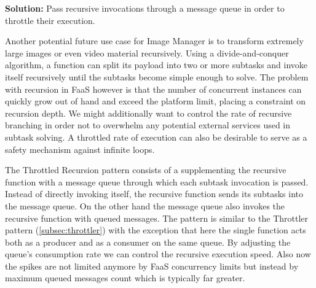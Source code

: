 
\textbf{Solution:} Pass recursive invocations through a message queue in order to throttle their execution.

Another potential future use case for Image Manager is to transform extremely large images or even video material recursively. Using a divide-and-conquer algorithm, a function can split its payload into two or more subtasks and invoke itself recursively until the subtasks become simple enough to solve. The problem with recursion in FaaS however is that the number of concurrent instances can quickly grow out of hand and exceed the platform limit, placing a constraint on recursion depth. We might additionally want to control the rate of recursive branching in order not to overwhelm any potential external services used in subtask solving. A throttled rate of execution can also be desirable to serve as a safety mechanism against infinite loops.

The Throttled Recursion pattern consists of a supplementing the recursive function with a message queue through which each subtask invocation is passed. Instead of directly invoking itself, the recursive function sends its subtasks into the message queue. On the other hand the message queue also invokes the recursive function with queued messages. The pattern is similar to the Throttler pattern (\ref{subsec:throttler}) with the exception that here the single function acts both as a producer and as a consumer on the same queue. By adjusting the queue's consumption rate we can control the recursive execution speed. Also now the spikes are not limited anymore by FaaS concurrency limits but instead by maximum queued messages count which is typically far greater.
